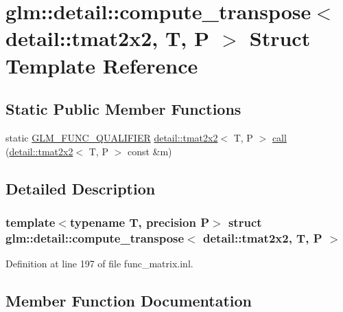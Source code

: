\hypertarget{structglm_1_1detail_1_1compute__transpose_3_01detail_1_1tmat2x2_00_01_t_00_01_p_01_4}{}\section{glm\+:\+:detail\+:\+:compute\+\_\+transpose$<$ detail\+:\+:tmat2x2, T, P $>$ Struct Template Reference}
\label{structglm_1_1detail_1_1compute__transpose_3_01detail_1_1tmat2x2_00_01_t_00_01_p_01_4}
\subsection*{Static Public Member Functions}
\begin{DoxyCompactItemize}
\item 
static \hyperlink{setup_8hpp_a33fdea6f91c5f834105f7415e2a64407}{G\+L\+M\+\_\+\+F\+U\+N\+C\+\_\+\+Q\+U\+A\+L\+I\+F\+I\+ER} \hyperlink{structglm_1_1detail_1_1tmat2x2}{detail\+::tmat2x2}$<$ T, P $>$ \hyperlink{structglm_1_1detail_1_1compute__transpose_3_01detail_1_1tmat2x2_00_01_t_00_01_p_01_4_a213c7106f07140855ec81d916ae5f629}{call} (\hyperlink{structglm_1_1detail_1_1tmat2x2}{detail\+::tmat2x2}$<$ T, P $>$ const \&m)
\end{DoxyCompactItemize}


\subsection{Detailed Description}
\subsubsection*{template$<$typename T, precision P$>$\newline
struct glm\+::detail\+::compute\+\_\+transpose$<$ detail\+::tmat2x2, T, P $>$}



Definition at line 197 of file func\+\_\+matrix.\+inl.



\subsection{Member Function Documentation}
\mbox{\label{structglm_1_1detail_1_1compute__transpose_3_01detail_1_1tmat2x2_00_01_t_00_01_p_01_4_a213c7106f07140855ec81d916ae5f629}} 
